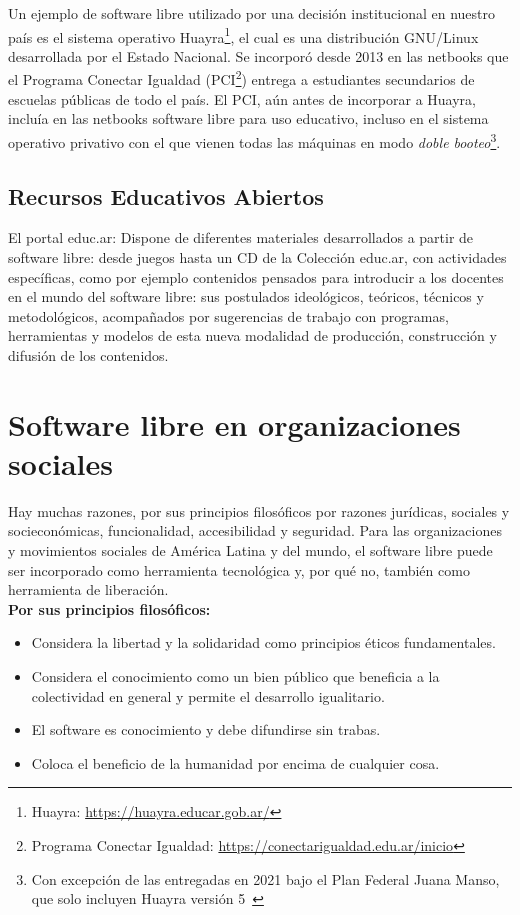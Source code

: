 Un ejemplo de software libre utilizado por una decisión institucional en nuestro país es el sistema operativo Huayra\footnote{Huayra: \url{https://huayra.educar.gob.ar/}}, el cual es una distribución GNU/Linux desarrollada por el Estado Nacional. Se incorporó desde 2013 en las netbooks que el Programa Conectar Igualdad (PCI\footnote{Programa Conectar Igualdad: \url{https://conectarigualdad.edu.ar/inicio}}) entrega a estudiantes secundarios de escuelas públicas de todo el país. El PCI, aún antes de incorporar a Huayra, incluía en las netbooks software libre para uso educativo, incluso en el sistema operativo privativo con el que vienen todas las máquinas en modo \emph{doble booteo}\footnote{Con excepción de las entregadas en 2021 bajo el Plan Federal Juana Manso, que solo incluyen Huayra versión 5~\cite{distefano21}}.

\subsection{Recursos Educativos Abiertos}

El portal educ.ar: Dispone de diferentes materiales desarrollados a partir de software libre: desde juegos hasta un CD de la Colección educ.ar, con actividades específicas, como por ejemplo contenidos pensados para introducir a los docentes en el mundo del software libre: sus postulados ideológicos, teóricos, técnicos y metodológicos, acompañados por sugerencias de trabajo con programas, herramientas y modelos de esta nueva modalidad de producción, construcción y difusión de los contenidos.


\section{Software libre en organizaciones sociales}
Hay muchas razones, por sus principios filosóficos por razones jurídicas, sociales y socieconómicas, funcionalidad, accesibilidad y seguridad. Para las organizaciones y movimientos sociales de América Latina y del mundo, el software libre puede ser incorporado como herramienta tecnológica y, por qué no, también como herramienta de liberación.\\
{\bf Por sus principios filosóficos:}

\begin{itemize}
\item Considera la libertad y la solidaridad como principios éticos fundamentales.
\item Considera el conocimiento como un bien público que beneficia a la colectividad en general y permite el desarrollo igualitario.
\item El software es conocimiento y debe difundirse sin trabas.
\item Coloca el beneficio de la humanidad por encima de cualquier cosa.
\end{itemize}

